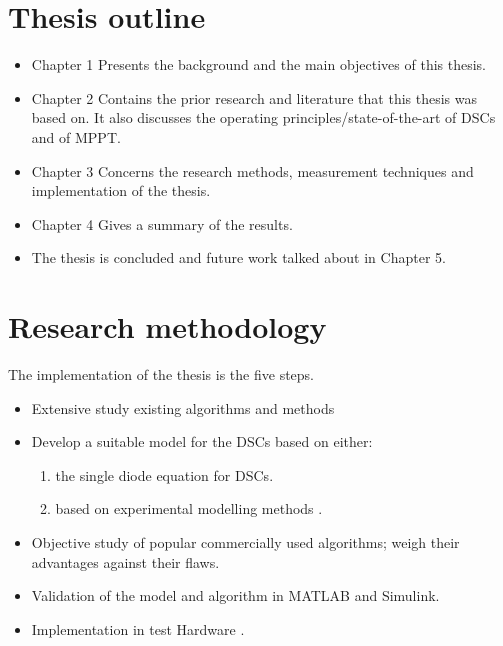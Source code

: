 \section{Thesis outline}
\begin{itemize}
\item Chapter 1 Presents the background and the main objectives of this thesis. \\
\item Chapter 2 Contains the prior research and literature that this thesis was based on. It also discusses the operating principles/state-of-the-art  of \ac{DSCs} and of \ac{MPPT}. \\
\item Chapter 3 Concerns the research methods, measurement techniques and implementation of the thesis.
\item Chapter 4 Gives a summary of the results. 
\item The thesis is concluded and future work talked about in Chapter 5.
\end {itemize}

\section{Research methodology}
The implementation of the thesis is the five steps. 
\begin{itemize}
\item Extensive study existing algorithms and methods  
\item Develop a suitable model for the \ac{DSCs} based on either:
	\begin{enumerate}
		\item the single diode equation for \ac{DSCs}.
		\item based on experimental modelling methods .
	\end{enumerate}
\item Objective study of popular commercially used algorithms;  weigh their advantages against their flaws.
\item Validation of the model and algorithm in MATLAB{\textregistered} and Simulink{\textregistered}.
\item Implementation in test Hardware .
\end {itemize}